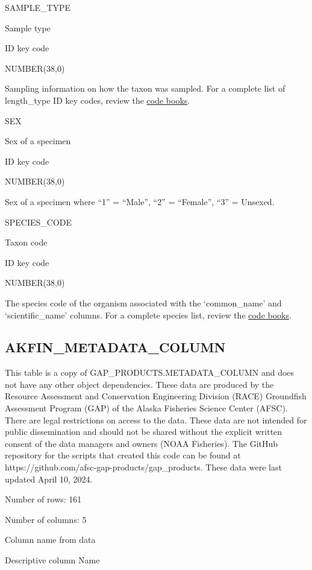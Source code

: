 \documentclass[
  letterpaper,
  oneside,
  open=any]{scrbook}
\begin{document}
SAMPLE\_TYPE

Sample type

ID key code

NUMBER(38,0)

Sampling information on how the taxon was sampled. For a complete list
of length\_type ID key codes, review the
\href{https://www.fisheries.noaa.gov/resource/document/groundfish-survey-species-code-manual-and-data-codes-manual}{code
books}.

SEX

Sex of a specimen

ID key code

NUMBER(38,0)

Sex of a specimen where ``1'' = ``Male'', ``2'' = ``Female'', ``3'' =
Unsexed.

SPECIES\_CODE

Taxon code

ID key code

NUMBER(38,0)

The species code of the organism associated with the `common\_name' and
`scientific\_name' columns. For a complete species list, review the
\href{https://www.fisheries.noaa.gov/resource/document/groundfish-survey-species-code-manual-and-data-codes-manual}{code
books}.

\hypertarget{akfin_metadata_column}{%
\subsection{AKFIN\_METADATA\_COLUMN}\label{akfin_metadata_column}}

This table is a copy of GAP\_PRODUCTS.METADATA\_COLUMN and does not have
any other object dependencies. These data are produced by the Resource
Assessment and Conservation Engineering Division (RACE) Groundfish
Assessment Program (GAP) of the Alaska Fisheries Science Center (AFSC).
There are legal restrictions on access to the data. These data are not
intended for public dissemination and should not be shared without the
explicit written consent of the data managers and owners (NOAA
Fisheries). The GitHub repository for the scripts that created this code
can be found at https://github.com/afsc-gap-products/gap\_products.
These data were last updated April 10, 2024.

Number of rows: 161

Number of columns: 5

Column name from data

Descriptive column Name
\end{document}
